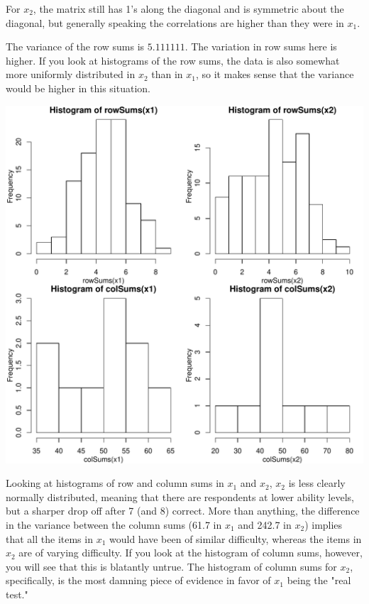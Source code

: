 \documentclass[letterpaper,12pt]{article}\usepackage[]{graphicx}\usepackage[]{color}
\makeatletter
\def\maxwidth{ %
  \ifdim\Gin@nat@width>\linewidth
    \linewidth
  \else
    \Gin@nat@width
  \fi
}
\newenvironment{knitrout}{}{} %
\numberwithin{equation}{section}
\makeatother
\begin{document}
For $x_2$, the matrix still has 1's along the diagonal and is symmetric about the diagonal, but generally speaking the correlations are higher than they were in $x_1$.

The variance of the row sums is $5.111111$.  The variation in row sums here is higher.  If you look at histograms of the row sums, the data is also somewhat more uniformly distributed in $x_2$ than in $x_1$, so it makes sense that the variance would be higher in this situation.

\begin{knitrout}
\color{fgcolor}
\includegraphics[width=\maxwidth]{figure/unnamed-chunk-6-1} 

\end{knitrout}


Looking at histograms of row and column sums in $x_1$ and $x_2$, $x_2$ is less clearly normally distributed, meaning that there are respondents at lower ability levels, but a sharper drop off after 7 (and 8) correct.  More than anything, the difference in the variance between the column sums (61.7 in $x_1$ and 242.7 in $x_2$) implies that all the items in $x_1$ would have been of similar difficulty, whereas the items in $x_2$ are of varying difficulty.  If you look at the histogram of column sums, however, you will see that this is blatantly untrue.  The histogram of column sums for $x_2$, specifically, is the most damning piece of evidence in favor of $x_1$ being the "real test."
\end{document}
